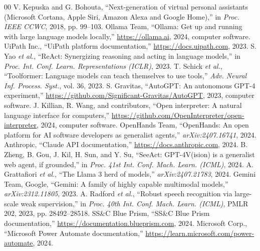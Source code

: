 \documentclass[conference]{IEEEtran}
\begin{document}
\begin{thebibliography}{00}
\footnotesize
\setlength{\itemsep}{0pt}
 V. Kepuska and G. Bohouta, ``Next-generation of virtual personal assistants (Microsoft Cortana, Apple Siri, Amazon Alexa and Google Home),'' in \emph{Proc. IEEE CCWC}, 2018, pp. 99--103.
 Ollama Team, ``Ollama: Get up and running with large language models locally,'' \url{https://ollama.ai}, 2024, computer software.
 UiPath Inc., ``UiPath platform documentation,'' \url{https://docs.uipath.com}, 2023.
 S. Yao \emph{et al.}, ``ReAct: Synergizing reasoning and acting in language models,'' in \emph{Proc. Int. Conf. Learn. Representations (ICLR)}, 2023.
 T. Schick \emph{et al.}, ``Toolformer: Language models can teach themselves to use tools,'' \emph{Adv. Neural Inf. Process. Syst.}, vol. 36, 2023.
 S. Gravitas, ``AutoGPT: An autonomous GPT-4 experiment,'' \url{https://github.com/Significant-Gravitas/AutoGPT}, 2023, computer software.
 J. Killian, R. Wang, and contributors, ``Open interpreter: A natural language interface for computers,'' \url{https://github.com/OpenInterpreter/open-interpreter}, 2024, computer software.
 OpenHands Team, ``OpenHands: An open platform for AI software developers as generalist agents,'' \emph{arXiv:2407.16741}, 2024.
 Anthropic, ``Claude API documentation,'' \url{https://docs.anthropic.com}, 2024.
 B. Zheng, B. Gou, J. Kil, H. Sun, and Y. Su, ``SeeAct: GPT-4V(ision) is a generalist web agent, if grounded,'' in \emph{Proc. 41st Int. Conf. Mach. Learn. (ICML)}, 2024.
 A. Grattafiori \emph{et al.}, ``The Llama 3 herd of models,'' \emph{arXiv:2407.21783}, 2024.
 Gemini Team, Google, ``Gemini: A family of highly capable multimodal models,'' \emph{arXiv:2312.11805}, 2023.
 A. Radford \emph{et al.}, ``Robust speech recognition via large-scale weak supervision,'' in \emph{Proc. 40th Int. Conf. Mach. Learn. (ICML)}, PMLR 202, 2023, pp. 28492--28518.
 SS\&C Blue Prism, ``SS\&C Blue Prism documentation,'' \url{https://documentation.blueprism.com}, 2024.
 Microsoft Corp., ``Microsoft Power Automate documentation,'' \url{https://learn.microsoft.com/power-automate}, 2024.

\end{thebibliography}
\end{document}
